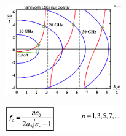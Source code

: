 \documentclass[english]{latex4ei/latex4ei_sheet}
\begin{document}
\begin{sectionbox}
    \begin{center}\includegraphics[width = 5cm]{./img/dielektr-ug2.png}\end{center}
    \begin{center}\includegraphics[width = 5cm]{./img/dielektr-ugfc.png}\end{center}
\end{sectionbox}
\end{document}
